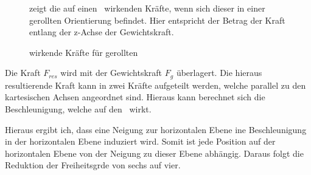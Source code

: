 \begin{figure}[ht!]
\vspace{0.25cm}
\begin{center}
\caption{wirkende Kräfte für gerollten \Quad\ }
\label{fig:ForcesRolled}
\end{center}

\vspace{0.25cm}
 zeigt die auf einen \Quad\ wirkenden Kräfte, wenn sich dieser in einer gerollten Orientierung befindet. Hier entspricht der Betrag der Kraft entlang der z-Achse der Gewichtskraft.


\end{figure}


Die Kraft $F_{res}$ wird mit der Gewichtskraft $F_g$ überlagert. Die hieraus resultierende Kraft kann in zwei Kräfte aufgeteilt werden, welche parallel zu den kartesischen Achsen angeordnet sind. Hieraus kann berechnet sich die Beschleunigung, welche auf den \Quad\ wirkt.





Hieraus ergibt ich, dass eine Neigung zur horizontalen Ebene ine Beschleunigung in der horizontalen Ebene induziert wird. Somit ist jede Position auf der horizontalen Ebene von der Neigung zu dieser Ebene abhängig. Daraus folgt die Reduktion der Freiheitsgrde von sechs auf vier.





























